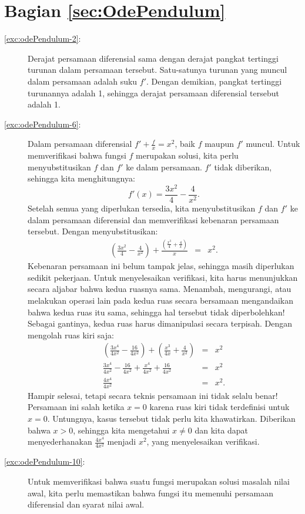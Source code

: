 \section*{Bagian \ref{sec:OdePendulum}}
\begin{description}
\item [{\ref{exc:odePendulum-2}:}] Derajat persamaan diferensial sama
dengan derajat pangkat tertinggi turunan dalam persamaan tersebut.
Satu-satunya turunan yang muncul dalam persamaan adalah suku $f'$.
Dengan demikian, pangkat tertinggi turunannya adalah 1, sehingga derajat
persamaan diferensial tersebut adalah 1.
\item [{\ref{exc:odePendulum-6}:}] Dalam persamaan diferensial $f'+\frac{f}{x}=x^{2}$,
baik $f$ maupun $f'$ muncul. Untuk memverifikasi bahwa fungsi $f$
merupakan solusi, kita perlu menyubstitusikan $f$ dan $f'$ ke dalam
persamaan. $f'$ tidak diberikan, sehingga kita menghitungnya:
\[
f'(x)=\frac{3x^{2}}{4}-\frac{4}{x^{2}}.
\]
Setelah semua yang diperlukan tersedia, kita menyubstitusikan $f$
dan $f'$ ke dalam persamaan diferensial dan memverifikasi kebenaran
persamaan tersebut. Dengan menyubstitusikan:
\begin{eqnarray*}
\left(\frac{3x^{2}}{4}-\frac{4}{x^{2}}\right)+\frac{\left(\frac{x^{3}}{4}+\frac{4}{x}\right)}{x} & = & x^{2}.
\end{eqnarray*}
Kebenaran persamaan ini belum tampak jelas, sehingga masih diperlukan
sedikit pekerjaan. Untuk menyelesaikan verifikasi, kita harus menunjukkan
secara aljabar bahwa kedua ruasnya sama. Menambah, mengurangi, atau
melakukan operasi lain pada kedua ruas secara bersamaan mengandaikan
bahwa kedua ruas itu sama, sehingga hal tersebut tidak diperbolehkan!
Sebagai gantinya, kedua ruas harus dimanipulasi secara terpisah. Dengan
mengolah ruas kiri saja:
\begin{eqnarray*}
\left(\frac{3x^{4}}{4x^{2}}-\frac{16}{4x^{2}}\right)+\left(\frac{x^{3}}{4x}+\frac{4}{x^{2}}\right) & = & x^{2}\\
\frac{3x^{4}}{4x^{2}}-\frac{16}{4x^{2}}+\frac{x^{4}}{4x^{2}}+\frac{16}{4x^{2}} & = & x^{2}\\
\frac{4x^{4}}{4x^{2}} & = & x^{2}.
\end{eqnarray*}
Hampir selesai, tetapi secara teknis persamaan ini tidak selalu benar!
Persamaan ini salah ketika $x=0$ karena ruas kiri tidak terdefinisi
untuk $x=0$. Untungnya, kasus tersebut tidak perlu kita khawatirkan.
Diberikan bahwa $x>0$, sehingga kita mengetahui $x\neq0$ dan kita
dapat menyederhanakan $\frac{4x^{4}}{4x^{2}}$ menjadi $x^{2}$, yang
menyelesaikan verifikasi.
\item [{\ref{exc:odePendulum-10}:}] Untuk memverifikasi bahwa suatu fungsi
merupakan solusi masalah nilai awal, kita perlu memastikan bahwa fungsi
itu memenuhi persamaan diferensial dan syarat nilai awal. 


\end{description}
